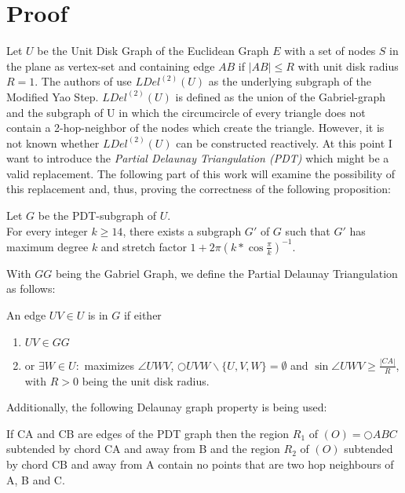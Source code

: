 \section{Proof}
Let $U $ be the Unit Disk Graph of the Euclidean Graph $E $ with a set of nodes $S $ in the plane as vertex-set and containing edge $AB $ if $|AB| \leq R $ with unit disk radius $R=1 $.
The authors of \cite{kanj} use $LDel^{(2)}(U) $ as the underlying subgraph of the Modified Yao Step.
$LDel^{(2)}(U) $ is defined as the union of the Gabriel-graph and the subgraph of U in which the circumcircle of every triangle does not contain a 2-hop-neighbor of the nodes which create the triangle.
However, it is not known whether $LDel^{(2)}(U) $ can be constructed reactively.
At this point I want to introduce the \emph{Partial Delaunay Triangulation (PDT)} \cite{pdt} which might be a valid replacement.
The following part of this work will examine the possibility of this replacement and, thus, proving the correctness of the following proposition:

\begin{prop}
\label{mastertheorem}
Let $G $ be the PDT-subgraph of $U $.\\
For every integer $k \geq 14 $, there exists a subgraph $G' $ of $G $ such that $G' $ has maximum degree $k $ and stretch factor $1+2\pi (k*\cos{\frac{\pi}{k}})^{-1} $.
\end{prop} 


With $GG $ being the Gabriel Graph, we define the Partial Delaunay Triangulation as follows:
\begin{definition}
\label{pdt-def}
An edge $UV \in U $ is in $G $ if either 
\begin{enumerate}
\renewcommand{\labelenumi}{(\roman{enumi})}
 \item $UV \in GG $
 \item or $\exists{W} \in U : $ maximizes $\angle{UWV} $, $\bigcirc{UVW}  \backslash \{U, V, W\} = \emptyset $ and $\sin{\angle{UWV}} \geq\frac{|CA|}{R} $, with $R>0 $ being the unit disk radius.
\end{enumerate} 
\end{definition}


Additionally, the following Delaunay graph property is being used:
\begin{lemma}
\label{emptyregion}
If CA and CB are edges of the PDT graph then the region $R_1 $ of $(O)=\bigcirc{ABC} $ subtended by chord CA and away from B and the region $R_2 $ of $(O) $ subtended by chord CB and away from A contain no points that are two hop neighbours of A, B and C.
\end{lemma}


